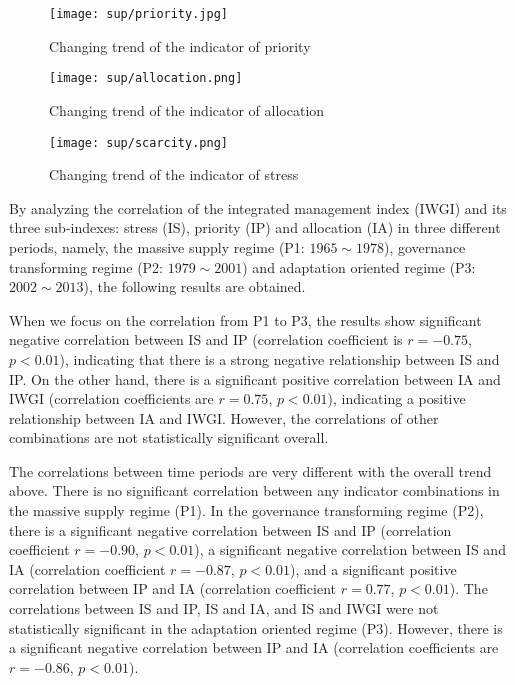 \documentclass[draft,wrr]{../agutexSI2019}
\begin{document}
\begin{article}
\begin{figure}[htb]
\centering
\texttt{[image: sup/priority.jpg]}
\caption{Changing trend of the indicator of priority}\label{fig:priority}
\end{figure}

\begin{figure}[htb]
\centering
\texttt{[image: sup/allocation.png]}
\caption{Changing trend of the indicator of allocation}\label{fig:allocation}
\end{figure}

\begin{figure}[htb]
\centering
\texttt{[image: sup/scarcity.png]}
\caption{Changing trend of the indicator of stress}\label{fig:scarcity}
\end{figure}


By analyzing the correlation of the integrated management index (IWGI) and its three sub-indexes: stress (IS), priority (IP) and allocation (IA) in three different periods, namely, the massive supply regime (P1: $1965 \sim 1978$), governance transforming regime (P2: $1979 \sim 2001$) and adaptation oriented regime (P3: $2002 \sim 2013$), the following results are obtained.

When we focus on the correlation from P1 to P3, the results show significant negative correlation between IS and IP (correlation coefficient is $r = -0.75$, $p < 0.01$), indicating that there is a strong negative relationship between IS and IP.
On the other hand, there is a significant positive correlation between IA and IWGI (correlation coefficients are $r = 0.75$, $p < 0.01$), indicating a positive relationship between IA and IWGI. However, the correlations of other combinations are not statistically significant overall.

The correlations between time periods are very different with the overall trend above.
There is no significant correlation between any indicator combinations in the massive supply regime (P1).
In the governance transforming regime (P2), there is a significant negative correlation between IS and IP (correlation coefficient $r = -0.90$, $p < 0.01$), a significant negative correlation between IS and IA (correlation coefficient $r = -0.87$, $p < 0.01$), and a significant positive correlation between IP and IA (correlation coefficient $r = 0.77$, $p < 0.01$).
The correlations between IS and IP, IS and IA, and IS and IWGI were not statistically significant in the adaptation oriented regime (P3). However, there is a significant negative correlation between IP and IA (correlation coefficients are $r = -0.86$, $p < 0.01$).


\end{article}
\end{document}
